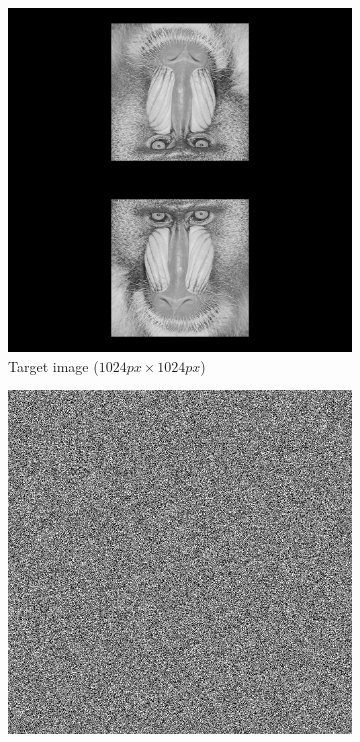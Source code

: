 \begin{figure}[H]
  \centering
  \begin{subfigure}[t]{0.3\textwidth}
    \centering
    \includegraphics[width=\textwidth]{mandrill_2.png}
    \caption{Target image ($1024 px\times 1024 px$)}
    \label{fig:mandrill_2_SA}
  \end{subfigure}
  \hfill
  \begin{subfigure}[t]{0.3\textwidth}
    \centering
    \includegraphics[width=\textwidth]{SA_mandrill_2_Holo.png}

\end{subfigure}
\end{figure}

